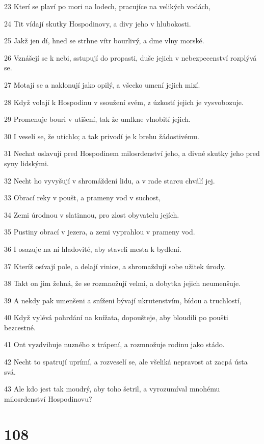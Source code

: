 \par 23 Kterí se plaví po mori na lodech, pracujíce na velikých vodách,
\par 24 Tit vídají skutky Hospodinovy, a divy jeho v hlubokosti.
\par 25 Jakž jen dí, hned se strhne vítr bourlivý, a dme vlny morské.
\par 26 Vznášejí se k nebi, sstupují do propasti, duše jejich v nebezpecenství rozplývá se.
\par 27 Motají se a naklonují jako opilý, a všecko umení jejich mizí.
\par 28 Když volají k Hospodinu v ssoužení svém, z úzkostí jejich je vysvobozuje.
\par 29 Promenuje bouri v utišení, tak že umlkne vlnobití jejich.
\par 30 I veselí se, že utichlo; a tak privodí je k brehu žádostivému.
\par 31 Nechat oslavují pred Hospodinem milosrdenství jeho, a divné skutky jeho pred syny lidskými.
\par 32 Necht ho vyvyšují v shromáždení lidu, a v rade starcu chválí jej.
\par 33 Obrací reky v poušt, a prameny vod v suchost,
\par 34 Zemi úrodnou v slatinnou, pro zlost obyvatelu jejích.
\par 35 Pustiny obrací v jezera, a zemi vyprahlou v prameny vod.
\par 36 I osazuje na ní hladovité, aby staveli mesta k bydlení.
\par 37 Kteríž osívají pole, a delají vinice, a shromaždují sobe užitek úrody.
\par 38 Takt on jim žehná, že se rozmnožují velmi, a dobytka jejich neumenšuje.
\par 39 A nekdy pak umenšeni a sníženi bývají ukrutenstvím, bídou a truchlostí,
\par 40 Když vylévá pohrdání na knížata, dopoušteje, aby bloudili po poušti bezcestné.
\par 41 Ont vyzdvihuje nuzného z trápení, a rozmnožuje rodinu jako stádo.
\par 42 Necht to spatrují uprímí, a rozveselí se, ale všeliká nepravost at zacpá ústa svá.
\par 43 Ale kdo jest tak moudrý, aby toho šetril, a vyrozumíval mnohému milosrdenství Hospodinovu?

\chapter{108}

